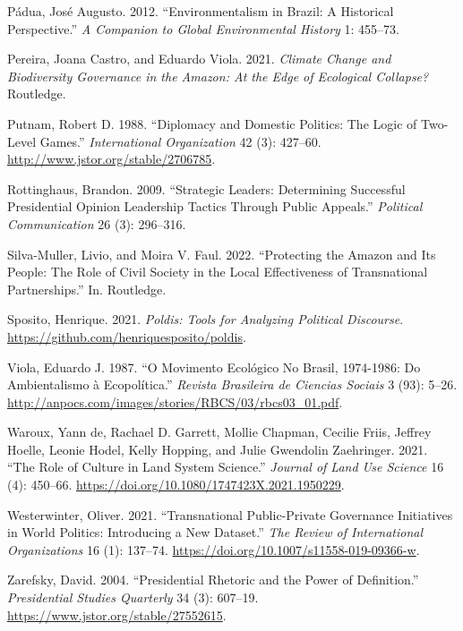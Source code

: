 \documentclass[
]{article}
\newlength{\cslhangindent}
\newlength{\cslentryspacingunit} %
\newenvironment{CSLReferences}[2] %
 {%
  \setlength{\parindent}{0pt}
  \ifodd #1
  \let\oldpar\par
  \def\par{\hangindent=\cslhangindent\oldpar}
  \fi
  \setlength{\parskip}{#2\cslentryspacingunit}
 }%
 {}
\begin{document}
\begin{CSLReferences}{1}{0}
\leavevmode{}%
Pádua, José Augusto. 2012. {``Environmentalism in Brazil: A Historical
Perspective.''} \emph{A Companion to Global Environmental History} 1:
455--73.

\leavevmode{}%
Pereira, Joana Castro, and Eduardo Viola. 2021. \emph{Climate Change and
Biodiversity Governance in the Amazon: At the Edge of Ecological
Collapse?} Routledge.

\leavevmode{}%
Putnam, Robert D. 1988. {``Diplomacy and Domestic Politics: The Logic of
Two-Level Games.''} \emph{International Organization} 42 (3): 427--60.
\url{http://www.jstor.org/stable/2706785}.

\leavevmode{}%
Rottinghaus, Brandon. 2009. {``Strategic Leaders: Determining Successful
Presidential Opinion Leadership Tactics Through Public Appeals.''}
\emph{Political Communication} 26 (3): 296--316.

\leavevmode{}%
Silva-Muller, Livio, and Moira V. Faul. 2022. {``Protecting the Amazon
and Its People: The Role of Civil Society in the Local Effectiveness of
Transnational Partnerships.''} In. Routledge.

\leavevmode{}%
Sposito, Henrique. 2021. \emph{Poldis: Tools for Analyzing Political
Discourse}. \url{https://github.com/henriquesposito/poldis}.

\leavevmode{}%
Viola, Eduardo J. 1987. {``O Movimento Ecológico No Brasil, 1974-1986:
Do Ambientalismo à Ecopolítica.''} \emph{Revista Brasileira de Ciencias
Sociais} 3 (93): 5--26.
\url{http://anpocs.com/images/stories/RBCS/03/rbcs03_01.pdf}.

\leavevmode{}%
Waroux, Yann de, Rachael D. Garrett, Mollie Chapman, Cecilie Friis,
Jeffrey Hoelle, Leonie Hodel, Kelly Hopping, and Julie Gwendolin
Zaehringer. 2021. {``The Role of Culture in Land System Science.''}
\emph{Journal of Land Use Science} 16 (4): 450--66.
\url{https://doi.org/10.1080/1747423X.2021.1950229}.

\leavevmode{}%
Westerwinter, Oliver. 2021. {``Transnational Public-Private Governance
Initiatives in World Politics: Introducing a New Dataset.''} \emph{The
Review of International Organizations} 16 (1): 137--74.
\url{https://doi.org/10.1007/s11558-019-09366-w}.

\leavevmode{}%
Zarefsky, David. 2004. {``Presidential Rhetoric and the Power of
Definition.''} \emph{Presidential Studies Quarterly} 34 (3): 607--19.
\url{https://www.jstor.org/stable/27552615}.

\end{CSLReferences}
\end{document}

